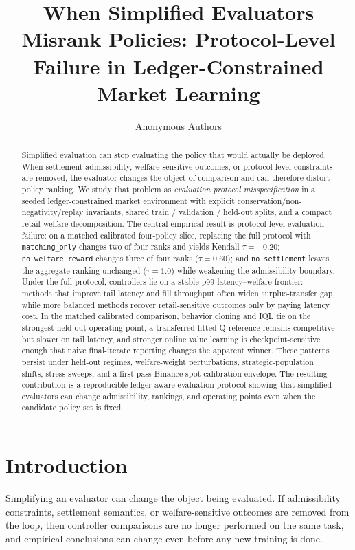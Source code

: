 \documentclass[11pt]{article}
\title{When Simplified Evaluators Misrank Policies: Protocol-Level Failure in Ledger-Constrained Market Learning}
\author{Anonymous Authors}
\date{}
\begin{document}
\maketitle

\begin{abstract}
Simplified evaluation can stop evaluating the policy that would actually be deployed. When settlement admissibility, welfare-sensitive outcomes, or protocol-level constraints are removed, the evaluator changes the object of comparison and can therefore distort policy ranking. We study that problem as \emph{evaluation protocol misspecification} in a seeded ledger-constrained market environment with explicit conservation/non-negativity/replay invariants, shared train / validation / held-out splits, and a compact retail-welfare decomposition. The central empirical result is protocol-level evaluation failure: on a matched calibrated four-policy slice, replacing the full protocol with \texttt{matching\_only} changes two of four ranks and yields Kendall $\tau=-0.20$; \texttt{no\_welfare\_reward} changes three of four ranks ($\tau=0.60$); and \texttt{no\_settlement} leaves the aggregate ranking unchanged ($\tau=1.0$) while weakening the admissibility boundary. Under the full protocol, controllers lie on a stable p99-latency--welfare frontier: methods that improve tail latency and fill throughput often widen surplus-transfer gap, while more balanced methods recover retail-sensitive outcomes only by paying latency cost. In the matched calibrated comparison, behavior cloning and IQL tie on the strongest held-out operating point, a transferred fitted-Q reference remains competitive but slower on tail latency, and stronger online value learning is checkpoint-sensitive enough that naive final-iterate reporting changes the apparent winner. These patterns persist under held-out regimes, welfare-weight perturbations, strategic-population shifts, stress sweeps, and a first-pass Binance spot calibration envelope. The resulting contribution is a reproducible ledger-aware evaluation protocol showing that simplified evaluators can change admissibility, rankings, and operating points even when the candidate policy set is fixed.
\end{abstract}

\section{Introduction}
Simplifying an evaluator can change the object being evaluated. If admissibility constraints, settlement semantics, or welfare-sensitive outcomes are removed from the loop, then controller comparisons are no longer performed on the same task, and empirical conclusions can change even before any new training is done.
\end{document}
